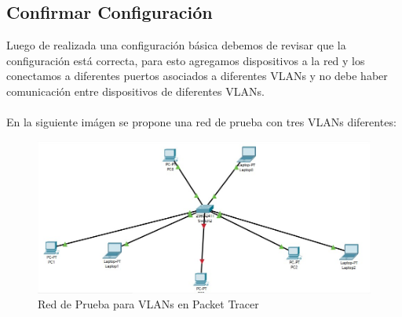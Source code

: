 \documentclass[journal]{IEEEtran}
\begin{document}
\subsection{\textbf{Confirmar Configuración}}
Luego de realizada una configuración básica debemos de revisar que la configuración está correcta, para esto agregamos dispositivos a la red y los conectamos a diferentes puertos asociados a diferentes VLANs y no debe haber comunicación entre dispositivos de diferentes VLANs. \\ \\

En la siguiente imágen se propone una red de prueba con tres VLANs diferentes:

\begin{figure}[ht]
	\centering
	\includegraphics[scale=0.27]{red_prueba.jpg}
	\caption{Red de Prueba para VLANs en Packet Tracer}
\end{figure}
\end{document}
